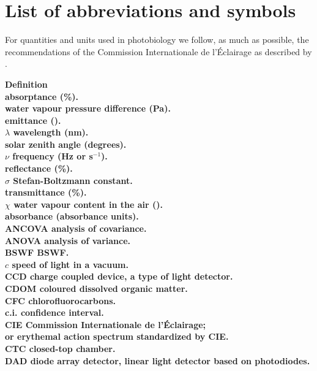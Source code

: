 
\chapter{List of abbreviations and symbols}

For quantities and units used in photobiology we follow, as much as possible, the recommendations of the Commission Internationale de l'Éclairage as described by \citet{Sliney2007}.
\begin{tabbing}
 \= \bf Definition \\[1ex]
\abst  \> \gls{absorptance} (\%).\\
\deltae \> water vapour pressure difference (Pa).\\
\emitt \> emittance (\watt).\\
$\lambda$ \>  wavelength (nm).\\
\SZA   \> solar zenith angle (degrees).\\
$\nu$ \> frequency (Hz or s$^{-1}$).\\
  \> \gls{reflectance} (\%).\\
$\sigma$ \> Stefan-Boltzmann constant.\\
\trans \> \gls{transmittance} (\%).\\
$\chi$ \> water vapour content in the air (\gmcubic).\\
\absb  \> \gls{absorbance} (absorbance units).\\
ANCOVA \> analysis of covariance.\\
ANOVA \> analysis of variance.\\
BSWF \> \gls{BSWF}.\\
$c$ \> speed of light in a vacuum.\\
CCD \> charge coupled device, a type of light detector.\\
CDOM \> coloured dissolved organic matter.\\
CFC \> chlorofluorocarbons.\\
c.i.\> confidence interval.\\
CIE \>  Commission Internationale de l'Éclairage;\\%
    \>  or erythemal action spectrum standardized by CIE.\\
CTC \> closed-top chamber.\\
DAD \> diode array detector, linear light detector based on photodiodes.\\

\end{tabbing}

